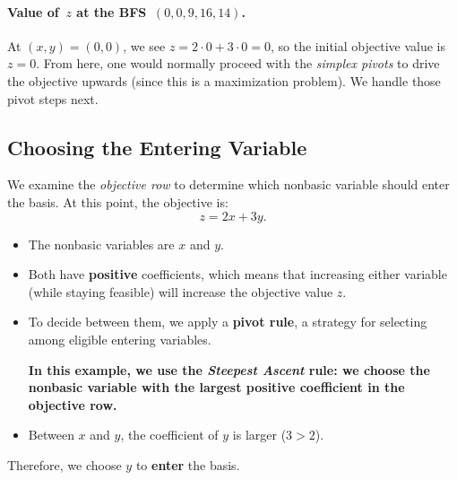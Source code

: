 \paragraph{Value of \(\,z\) at the BFS \(\,(0,0,9,16,14)\).}
At \((x,y)=(0,0)\), we see \(z=2\cdot 0 + 3\cdot 0=0\), so the initial
objective value is \(z=0\).  From here, one would normally proceed with the
\emph{simplex pivots} to drive the objective upwards (since this is a
maximization problem).  We handle those pivot steps next.
%
%

\subsection*{Choosing the Entering Variable}
\begin{tcolorbox}[colback=algenter!6, colframe=algenter, coltitle=white, fonttitle=\bfseries, sharp corners, title={\ding{43}\ Entering Variable}]

We examine the \emph{objective row} to determine which nonbasic variable should enter the basis. At this point, the objective is:
\[
z = 2x + 3y.
\]

\begin{itemize}
  \item The nonbasic variables are \(x\) and \(y\).
  \item Both have \textbf{positive} coefficients, which means that increasing either variable (while staying feasible) will increase the objective value \(z\).
  \item To decide between them, we apply a \textbf{pivot rule}, a strategy for selecting among eligible entering variables.
  
  \textbf{In this example, we use the \emph{Steepest Ascent} rule: we choose the nonbasic variable with the largest positive coefficient in the objective row.}
  
  \item Between \(x\) and \(y\), the coefficient of \(y\) is larger (\(3 > 2\)).
\end{itemize}

Therefore, we choose \(\boxed{y}\) to \textbf{enter} the basis.

\end{tcolorbox}

